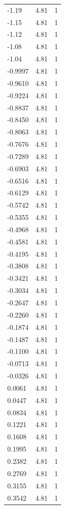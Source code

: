 \begin{longtable}{lrr}
  -1.19 & 4.81 & 1 \\
  -1.15 & 4.81 & 1 \\
  -1.12 & 4.81 & 1 \\
  -1.08 & 4.81 & 1 \\
  -1.04 & 4.81 & 1 \\
  -0.9997 & 4.81 & 1 \\
  -0.9610 & 4.81 & 1 \\
  -0.9224 & 4.81 & 1 \\
  -0.8837 & 4.81 & 1 \\
  -0.8450 & 4.81 & 1 \\
  -0.8063 & 4.81 & 1 \\
  -0.7676 & 4.81 & 1 \\
  -0.7289 & 4.81 & 1 \\
  -0.6903 & 4.81 & 1 \\
  -0.6516 & 4.81 & 1 \\
  -0.6129 & 4.81 & 1 \\
  -0.5742 & 4.81 & 1 \\
  -0.5355 & 4.81 & 1 \\
  -0.4968 & 4.81 & 1 \\
  -0.4581 & 4.81 & 1 \\
  -0.4195 & 4.81 & 1 \\
  -0.3808 & 4.81 & 1 \\
  -0.3421 & 4.81 & 1 \\
  -0.3034 & 4.81 & 1 \\
  -0.2647 & 4.81 & 1 \\
  -0.2260 & 4.81 & 1 \\
  -0.1874 & 4.81 & 1 \\
  -0.1487 & 4.81 & 1 \\
  -0.1100 & 4.81 & 1 \\
  -0.0713 & 4.81 & 1 \\
  -0.0326 & 4.81 & 1 \\
  0.0061 & 4.81 & 1 \\
  0.0447 & 4.81 & 1 \\
  0.0834 & 4.81 & 1 \\
  0.1221 & 4.81 & 1 \\
  0.1608 & 4.81 & 1 \\
  0.1995 & 4.81 & 1 \\
  0.2382 & 4.81 & 1 \\
  0.2769 & 4.81 & 1 \\
  0.3155 & 4.81 & 1 \\
  0.3542 & 4.81 & 1 \\

\end{longtable}

